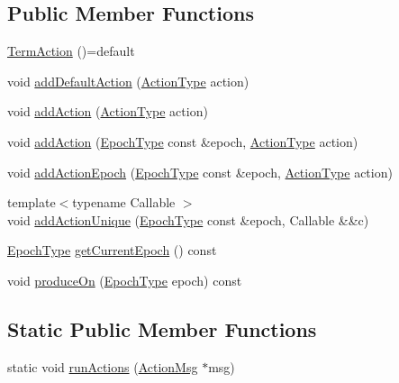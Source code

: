 \subsection*{Public Member Functions}
\begin{DoxyCompactItemize}
\item 
\hyperlink{structvt_1_1term_1_1_term_action_ac0b0f4271452cfbea674c6a7c4f50a4b}{Term\+Action} ()=default
\item 
void \hyperlink{structvt_1_1term_1_1_term_action_a9e9e174482720b4886ea4e8c38ead0d7}{add\+Default\+Action} (\hyperlink{namespacevt_ae0a5a7b18cc99d7b732cb4d44f46b0f3}{Action\+Type} action)
\item 
void \hyperlink{structvt_1_1term_1_1_term_action_a1227042cb4eb38937fb8ed34bcbdf998}{add\+Action} (\hyperlink{namespacevt_ae0a5a7b18cc99d7b732cb4d44f46b0f3}{Action\+Type} action)
\item 
void \hyperlink{structvt_1_1term_1_1_term_action_a15b79357805676e1ff2f880b02fd4061}{add\+Action} (\hyperlink{namespacevt_a81d11b28122d43bf9834577e4a06440f}{Epoch\+Type} const \&epoch, \hyperlink{namespacevt_ae0a5a7b18cc99d7b732cb4d44f46b0f3}{Action\+Type} action)
\item 
void \hyperlink{structvt_1_1term_1_1_term_action_a2429a48171da578d25d7672486a24b51}{add\+Action\+Epoch} (\hyperlink{namespacevt_a81d11b28122d43bf9834577e4a06440f}{Epoch\+Type} const \&epoch, \hyperlink{namespacevt_ae0a5a7b18cc99d7b732cb4d44f46b0f3}{Action\+Type} action)
\item 
{\footnotesize template$<$typename Callable $>$ }\\void \hyperlink{structvt_1_1term_1_1_term_action_a3ccd1689f56ab62821cfa6b1e65fc60b}{add\+Action\+Unique} (\hyperlink{namespacevt_a81d11b28122d43bf9834577e4a06440f}{Epoch\+Type} const \&epoch, Callable \&\&c)
\item 
\hyperlink{namespacevt_a81d11b28122d43bf9834577e4a06440f}{Epoch\+Type} \hyperlink{structvt_1_1term_1_1_term_action_a39d9b950c0a4820a424dc2d4dad4d38a}{get\+Current\+Epoch} () const
\item 
void \hyperlink{structvt_1_1term_1_1_term_action_a7022e4c4db4cffc376f8c228b32deee8}{produce\+On} (\hyperlink{namespacevt_a81d11b28122d43bf9834577e4a06440f}{Epoch\+Type} epoch) const
\end{DoxyCompactItemize}
\subsection*{Static Public Member Functions}
\begin{DoxyCompactItemize}
\item 
static void \hyperlink{structvt_1_1term_1_1_term_action_a13f4ee69a6e01f65de03320904737c64}{run\+Actions} (\hyperlink{structvt_1_1term_1_1_term_action_1_1_action_msg}{Action\+Msg} $\ast$msg)
\end{DoxyCompactItemize}

